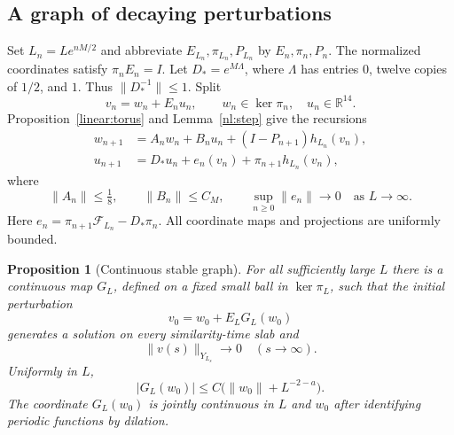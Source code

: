 \documentclass[11pt]{article}
\numberwithin{equation}{section}
\newtheorem{proposition}[theorem]{Proposition}
\theoremstyle{definition}
\theoremstyle{remark}
\begin{document}
\subsection{A graph of decaying perturbations}

Set $L_n=Le^{nM/2}$ and abbreviate $E_{L_n},\pi_{L_n},P_{L_n}$ by
$E_n,\pi_n,P_n$. The normalized coordinates satisfy $\pi_nE_n=I$.
Let $D_*=e^{M\Lambda}$, where $\Lambda$ has entries $0$, twelve copies
of $1/2$, and $1$. Thus $\|D_*^{-1}\|\leq1$.
Split
\[
 v_n=w_n+E_nu_n,\qquad w_n\in\ker\pi_n,\quad u_n\in\mathbb R^{14}.
\]
Proposition~\ref{linear:torus} and Lemma~\ref{nl:step} give the recursions
\begin{align}
 w_{n+1}&=A_nw_n+B_nu_n+(I-P_{n+1})h_{L_n}(v_n),\label{nl:forward}\\
 u_{n+1}&=D_*u_n+e_n(v_n)+\pi_{n+1}h_{L_n}(v_n),\label{nl:coordinates}
\end{align}
where
\[
 \|A_n\|\leq\tfrac18,\qquad \|B_n\|\leq C_M,\qquad
 \sup_{n\geq0}\|e_n\|\longrightarrow0\quad\text{as }L\to\infty.
\]
Here $e_n=\pi_{n+1}\mathcal F_{L_n}-D_*\pi_n$. All coordinate maps
and projections are uniformly bounded.

\begin{proposition}[Continuous stable graph]\label{nl:graph}
For all sufficiently large $L$ there is a continuous map $G_L$, defined
on a fixed small ball in $\ker\pi_L$, such that the initial perturbation
\[
 v_0=w_0+E_LG_L(w_0)
\]
generates a solution on every similarity-time slab and
\[
 \|v(s)\|_{Y_{L_s}}\longrightarrow0\quad(s\to\infty).
\]
Uniformly in $L$,
\begin{equation}\label{nl:graph-size}
 |G_L(w_0)|\leq C\bigl(\|w_0\|+L^{-2-a}\bigr).
\end{equation}
The coordinate $G_L(w_0)$ is jointly continuous in $L$ and $w_0$ after
identifying periodic functions by dilation.
\end{proposition}
\end{document}
